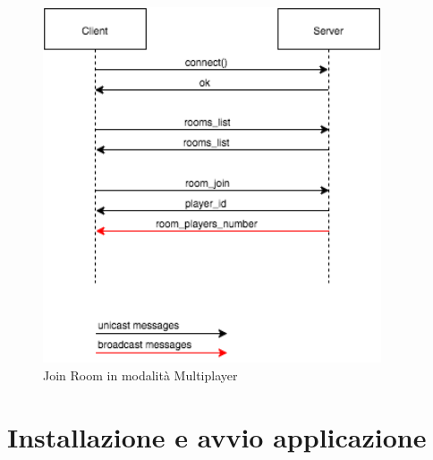 \documentclass[paper=a4, fontsize=11pt]{scrartcl} %
\numberwithin{equation}{section} %
\numberwithin{figure}{section} %
\numberwithin{table}{section} %
\begin{document}
\begin{figure}
\centering
\includegraphics[width=10cm]{MultiplayerJoinRoom}
\caption{Join Room in modalità Multiplayer}
\label{JoinRoom}
\end{figure}



\section{Installazione  e avvio applicazione}



\end{document}
